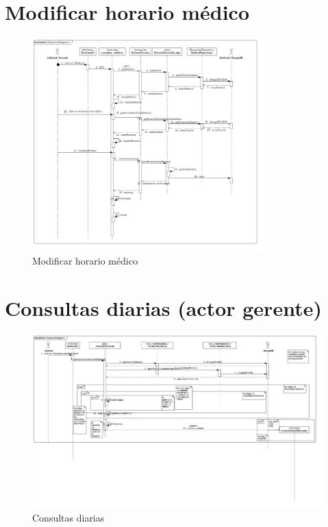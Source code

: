 \section{Modificar horario médico}
\begin{figure}[htbp!]
		\centering
			\includegraphics[width=0.8\textwidth]{uml/DiagramasSecuencia/Trujillo/uptHorario}
		\caption{Modificar horario médico}
	\end{figure}
	\newpage

\newpage
\section{Consultas diarias (actor gerente)}
\begin{figure}[htbp!]
		\centering
			\includegraphics[width=1\textwidth]{uml/DiagramasSecuencia/RubenMurga/getConsultasDia}
		\caption{Consultas diarias}
	\end{figure}


